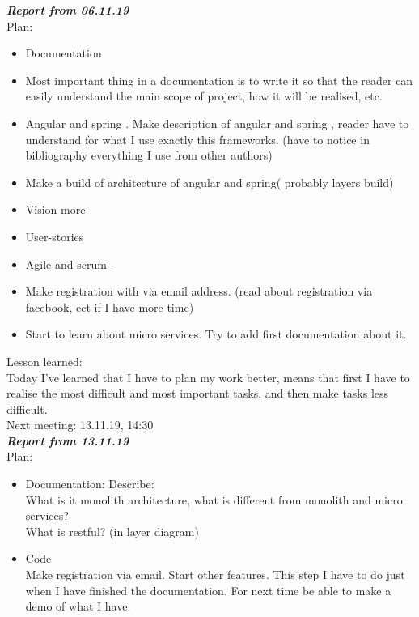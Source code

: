 \documentclass{scrartcl}
\begin{document}
\textbf{\textit{Report from 06.11.19}}\\
Plan:\\
\begin{itemize}


	\item	Documentation
	\item	Most important thing in a documentation is to write it so that the reader can easily understand the main scope of project, how it will be realised, etc.  
	\item	Angular and spring . Make description of angular and spring , reader have to understand for what I use exactly this frameworks. (have to notice in bibliography everything I use from other authors)
	\item	Make a build of architecture of angular and spring( probably layers build)
	\item	Vision more
	\item	User-stories
	\item	Agile and scrum -\/
	\item	Make registration with via email address. (read about registration via facebook, ect if I have more time)
	\item	 Start to learn about micro services. Try to add first documentation about it. 
\end{itemize}
Lesson learned:\\
Today I’ve learned that I have to plan my work better, means that first I have to realise the most difficult and most important tasks, and then make tasks less difficult. \\
 
Next meeting: 13.11.19, 14:30\\





\textbf{\textit{Report from 13.11.19}}\\

Plan:\\
\begin{itemize}
	\item	Documentation: 
Describe:\\
        What is it monolith architecture, what is different from monolith and micro services?\\
       What is restful? (in layer diagram)\\
	\item	Code \\
Make registration via email. Start other features. This step I have to do just when I have finished the documentation.
For next time be able to make a demo of what I have.
\end{itemize}
\end{document}
